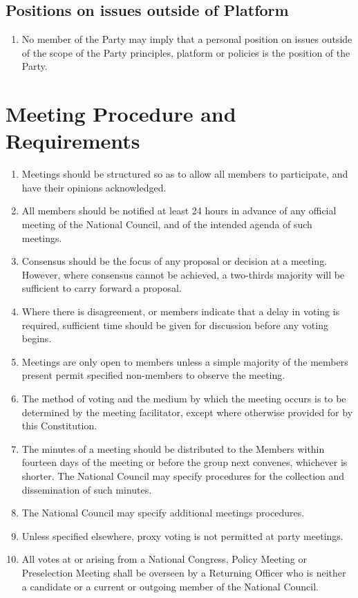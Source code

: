 \documentclass[a4paper,titlepage,8.5pt]{article}
\begin{document}
\subsection{Positions on issues outside of Platform}

\begin{enumerate}
\item No member of the Party may imply that a personal position on issues outside of the scope of the Party principles, platform or policies is the position of the Party.
\end{enumerate}

\section{Meeting Procedure and Requirements}

\begin{enumerate}
\item Meetings should be structured so as to allow all members to participate, and have their opinions acknowledged.
\item All members should be notified at least 24 hours in advance of any official meeting of the National Council, and of the intended agenda of such meetings.
\item Consensus should be the focus of any proposal or decision at a meeting. However, where consensus cannot be achieved, a two-thirds majority will be sufficient to carry forward a proposal.
\item Where there is disagreement, or members indicate that a delay in voting is required, sufficient time should be given for discussion before any voting begins.
\item Meetings are only open to members unless a simple majority of the members present permit specified non-members to observe the meeting.
\item The method of voting and the medium by which the meeting occurs is to be determined by the meeting facilitator, except where otherwise provided for by this Constitution.
\item The minutes of a meeting should be distributed to the Members within fourteen days of the meeting or before the group next convenes, whichever is shorter. The National Council may specify procedures for the collection and dissemination of such minutes.
\item The National Council may specify additional meetings procedures.
\item Unless specified elsewhere, proxy voting is not permitted at party meetings.
\item All votes at or arising from a National Congress, Policy Meeting or Preselection Meeting shall be overseen by a Returning Officer who is neither a candidate or a current or outgoing member of the National Council.
\end{enumerate}
\end{document}
